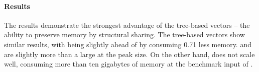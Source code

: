 \paragraph{Results}
The results demonstrate the strongest advantage of the tree-based vectors -- the ability to preserve memory by structural sharing. The tree-based vectors show similar results, with \imrsvec{} being slightly ahead of \pvec{} by consuming 0.71 less memory. \pvec{} and \imrsvec{} are slightly more than a  large at the peak size. On the other hand, \stdvec{} does not scale well, consuming more than ten gigabytes of memory at the benchmark input of .
